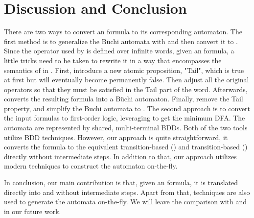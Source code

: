 \section{Discussion and Conclusion}\label{sec:discuss}
There are two ways to convert an \ltlf formula to its corresponding automaton. The first method is to generalize the B\"uchi automata with \spot and then convert it to \NFA. Since the \ltl operator used by \spot is defined over infinite words, given an \ltlf formula, a little tricks need to be taken to rewrite it in a way that encompasses the semantics of \ltlf in \ltl. First, introduce a new atomic proposition, "Tail", which is true at first but will eventually become permanently false. Then adjust all the original \ltl operators so that they must be satisfied in the Tail part of the word. Afterwards, \spot converts the resulting formula into a B\"uchi automaton. Finally, remove the Tail property, and simplify the Buchi automata to \NFA.
The second approach is to convert the input \ltlf formulas to first-order logic, leveraging \mona to get the minimum DFA. The automata are represented by shared, multi-terminal BDDs. Both of the two tools utilize BDD techniques. However, our approach is quite straightforward, it converts the \ltlf formula to the equivalent transition-based \NFA (\TNFA) and transition-based \DFA (\TDFA) directly without intermediate steps. In addition to that, our approach utilizes modern \SAT techniques to construct the automaton on-the-fly. 

In conclusion, our main contribution is that, given an \ltlf formula, it is translated directly into \TNFA and \TDFA without intermediate steps. Apart from that, \SAT techniques are also used to generate the automata on-the-fly. We will leave the comparison with \spot and \mona in our future work.
